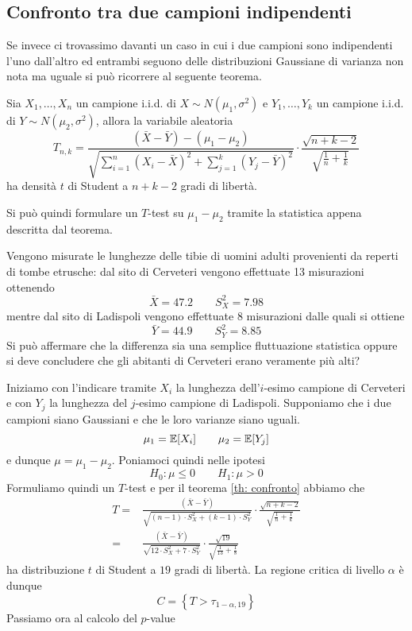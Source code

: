 \subsection{Confronto tra due campioni indipendenti}
Se invece ci trovassimo davanti un caso in cui i due campioni sono indipendenti l'uno dall'altro ed
entrambi seguono delle distribuzioni Gaussiane di varianza non nota ma uguale si può ricorrere al
seguente teorema.

\begin{theorem}\label{th: confronto}
	Sia $X_1, \dots, X_n$ un campione i.i.d. di $X \sim N(\mu_1, \sigma^2)$ e $Y_1, \dots, Y_k$ un
	campione i.i.d. di $Y \sim N(\mu_2, \sigma^2)$, allora la variabile aleatoria
	\[
		T_{n,k} = \frac{(\bar{X} - \bar{Y}) - (\mu_1 - \mu_2)}
		{\sqrt{\sum_{i=1}^n (X_i - \bar{X})^2 + \sum_{j=1}^k (Y_j - \bar{Y})^2}} \cdot
		\frac{\sqrt{n+k-2}}{\sqrt{\frac{1}{n} + \frac{1}{k}}}
	\]
	ha densità $t$ di Student a $n+k-2$ gradi di libertà.
\end{theorem}

Si può quindi formulare un $T$-test su $\mu_1 - \mu_2$ tramite la statistica appena descritta dal
teorema.

\begin{example}
	Vengono misurate le lunghezze delle tibie di uomini adulti provenienti da reperti di tombe
	etrusche: dal sito di Cerveteri vengono effettuate 13 misurazioni ottenendo
	\[ \bar{X} = 47.2 \qquad S_X^2 = 7.98 \]
	mentre dal sito di Ladispoli vengono effettuate 8 misurazioni dalle quali si ottiene
	\[ \bar{Y} = 44.9 \qquad S_Y^2 = 8.85 \]
	Si può affermare che la differenza sia una semplice fluttuazione statistica oppure si deve
	concludere che gli abitanti di Cerveteri erano veramente più alti?

	Iniziamo con l'indicare tramite $X_i$ la lunghezza dell'$i$-esimo campione di Cerveteri e con
	$Y_j$ la lunghezza del $j$-esimo campione di Ladispoli. Supponiamo che i due campioni siano
	Gaussiani e che le loro varianze siano uguali.
	\[ \mu_1 = \mathbb{E}[X_i] \qquad \mu_2 = \mathbb{E}[Y_j] \]
	e dunque $\mu = \mu_1 - \mu_2$. Poniamoci quindi nelle ipotesi
	\[ H_0 : \mu \leq 0 \qquad H_1 : \mu > 0 \]
	Formuliamo quindi un $T$-test e per il teorema \ref{th: confronto} abbiamo che
	\begin{align*}
		T = & \frac{(\bar{X} - \bar{Y})}
		{\sqrt{(n-1) \cdot S_X^2 + (k-1) \cdot S_Y^2}} \cdot
		\frac{\sqrt{n+k-2}}{\sqrt{\frac{1}{n} + \frac{1}{k}}} \\
		=   & \frac{(\bar{X} - \bar{Y})}
		{\sqrt{12 \cdot S_X^2 + 7 \cdot S_Y^2}} \cdot
		\frac{\sqrt{19}}{\sqrt{\frac{1}{13} + \frac{1}{8}}}
	\end{align*}
	ha distribuzione $t$ di Student a $19$ gradi di libertà. La regione critica di livello $\alpha$
	è dunque
	\[ C = \left\{ T > \tau_{1 - \alpha, 19} \right\} \]
	Passiamo ora al calcolo del $p$-value
\end{example}